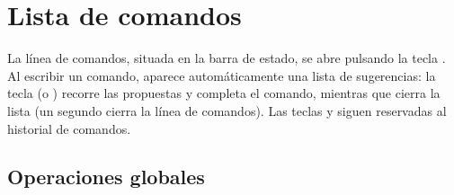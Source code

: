 \documentclass[letterpaper,10pt,spanish]{sphinxmanual}
\begin{document}
\sphinxstepscope


\section{Lista de comandos}
\label{\detokenize{cmd_mode:liste-des-commandes}}\label{\detokenize{cmd_mode:cmd-mode}}\label{\detokenize{cmd_mode::doc}}
\sphinxAtStartPar
La línea de comandos, situada en la barra de estado, se abre pulsando la tecla . Al escribir un comando, aparece automáticamente una lista de sugerencias: la tecla  (o ) recorre las propuestas y completa el comando, mientras que  cierra la lista (un segundo  cierra la línea de comandos). Las teclas  y  siguen reservadas al historial de comandos.


\subsection{Operaciones globales}
\label{\detokenize{cmd_mode:operations-globales}}\label{\detokenize{cmd_mode:cmd-global}}
\end{document}
